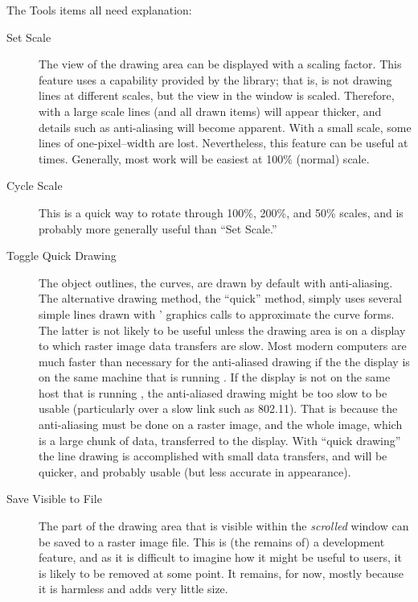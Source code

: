 			The Tools  items all need explanation:
			\begin{description}
			  \item[Set Scale] The view of the drawing area can be
			  displayed with a scaling factor. This feature uses a
			  capability provided by the 
			  library; that is, \IXpkg{} is not drawing lines at
			  different scales, but the view in the window is scaled.
			  Therefore, with a large scale lines (and all drawn
			  items) will appear thicker, and details such as
			  anti-aliasing will become apparent. With a small scale,
			  some lines of one-pixel--width are lost. Nevertheless,
			  this feature can be useful at times. Generally, most
			  work will be easiest at 100\% (normal) scale.
			  \item[Cycle Scale] This is a quick way to rotate through
			  100\%, 200\%, and 50\% scales, and is probably more
			  generally useful than ``Set Scale.''
			  \item[Toggle Quick Drawing] The object outlines, the
			  curves, are drawn by default with anti-aliasing. The
			  alternative drawing method, the ``quick'' method, simply
			  uses several simple lines drawn with
			  ' graphics  calls
			  to approximate the curve forms. The latter is not
			  likely to be useful unless the drawing area is on
			  a display to which raster image data transfers are
			  slow. Most modern computers are much faster than
			  necessary for the anti-aliased drawing if the the
			  display is on the same machine that is running \IXpkg.
			  If the display is not on the same host that is running
			  \IXpkg, the anti-aliased drawing might be too slow to
			  be usable (particularly over a slow link such as
			  802.11). That is because the anti-aliasing must be
			  done on a raster image, and the whole image,
			  which is a large chunk of data, transferred to the display.
			  With ``quick drawing'' the  line drawing
			  is accomplished with small data transfers, and will
			  be quicker, and probably usable (but less accurate
			  in appearance).
			  \item[Save Visible to File] The part of the drawing area
			  that is visible within the \emph{scrolled} window can
			  be saved to a raster image file. This is (the remains
			  of) a development feature, and as it is difficult to
			  imagine how it might be useful to users, it is likely
			  to be removed at some point. It remains, for now,
			  mostly because it is harmless and adds very little
			  size.
			\end{description}
			
